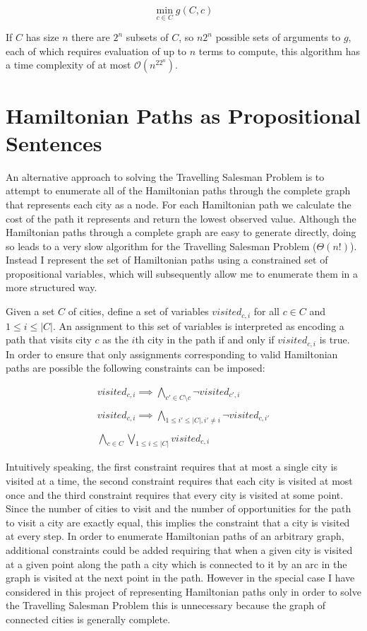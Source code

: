 \documentclass[12pt,a4paper,twoside,openright]{report}
\begin{document}
$$
\min_{c\in C} g(C,c)
$$

If $C$ has size $n$ there are $2^n$ subsets of $C$, so $n2^n$ possible sets of arguments to $g$, each of which requires evaluation of up to $n$ terms to compute, this algorithm has a time complexity of at most $\mathcal{O}(n^22^n)$.

\section{Hamiltonian Paths as Propositional Sentences} \label{hamiltonianpath}
An alternative approach to solving the Travelling Salesman Problem is to attempt to enumerate all of the Hamiltonian paths through the complete graph that represents each city as a node. For each Hamiltonian path we calculate the cost of the path it represents and return the lowest observed value. Although the Hamiltonian paths through a complete graph are easy to generate directly, doing so leads to a very slow algorithm for the Travelling Salesman Problem ($\Theta(n!)$). Instead I represent the set of Hamiltonian paths using a constrained set of propositional variables, which will subsequently allow me to enumerate them in a more structured way.

Given a set $C$ of cities, define a set of variables $visited_{c,i}$ for all $c\in C$ and $1\leq i\leq|C|$. An assignment to this set of variables is interpreted as encoding a path that visits city $c$ as the $i$th city in the path if and only if $visited_{c,i}$ is true. In order to ensure that only assignments corresponding to valid Hamiltonian paths are possible the following constraints can be imposed:

\begin{gather*}
visited_{c,i}\implies\bigwedge_{c'\in C\setminus c}\neg visited_{c',i} \\ \\
visited_{c,i}\implies\bigwedge_{1\leq i'\leq |C|,i'\neq i}\neg visited_{c,i'} \\ \\
\bigwedge_{c\in C}\bigvee_{1\leq i\leq |C|} visited_{c,i}
\end{gather*}

Intuitively speaking, the first constraint requires that at most a single city is visited at a time, the second constraint requires that each city is visited at most once and the third constraint requires that every city is visited at some point. Since the number of cities to visit and the number of opportunities for the path to visit a city are exactly equal, this implies the constraint that a city is visited at every step. In order to enumerate Hamiltonian paths of an arbitrary graph, additional constraints could be added requiring that when a given city is visited at a given point along the path a city which is connected to it by an arc in the graph is visited at the next point in the path. However in the special case I have considered in this project of representing Hamiltonian paths only in order to solve the Travelling Salesman Problem this is unnecessary because the graph of connected cities is generally complete.
\end{document}

